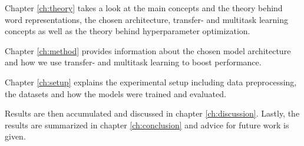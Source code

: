 Chapter \ref{ch:theory} takes a look at the main concepts and the theory behind word representations, the chosen architecture, transfer- and multitask learning concepts as well as the theory behind hyperparameter optimization.
\smallskip

Chapter \ref{ch:method} provides information about the chosen model architecture and how we use transfer- and multitask learning to boost performance.
\smallskip

Chapter \ref{ch:setup} explains the experimental setup including data preprocessing, the datasets and how the models were trained and evaluated.
\smallskip

Results are then accumulated and discussed in chapter \ref{ch:discussion}. Lastly, the results are
summarized in chapter \ref{ch:conclusion} and advice for future work is given.

